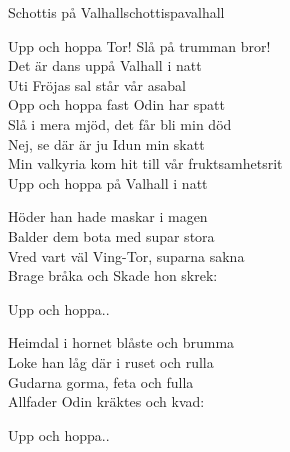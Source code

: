 \begin{song}{Schottis på Valhall}{schottispavalhall}
\begin{vers}
Upp och hoppa Tor! Slå på trumman bror!\\
Det är dans uppå Valhall i natt\\
Uti Fröjas sal står vår asabal\\
Opp och hoppa fast Odin har spatt\\
Slå i mera mjöd, det får bli min död\\
Nej, se där är ju Idun min skatt\\
Min valkyria kom hit till vår fruktsamhetsrit\\
Upp och hoppa på Valhall i natt\\
\end{vers}
\begin{vers}
Höder han hade maskar i magen\\
Balder dem bota med supar stora\\
Vred vart väl Ving-Tor, suparna sakna\\
Brage bråka och Skade hon skrek:\\
\end{vers}
\begin{vers}
Upp och hoppa..\\
\end{vers}
\begin{vers}
Heimdal i hornet blåste och brumma\\
Loke han låg där i ruset och rulla\\
Gudarna gorma, feta och fulla\\
Allfader Odin kräktes och kvad:\\
\end{vers}
\begin{vers}
Upp och hoppa..\\
\end{vers}
\end{song}

